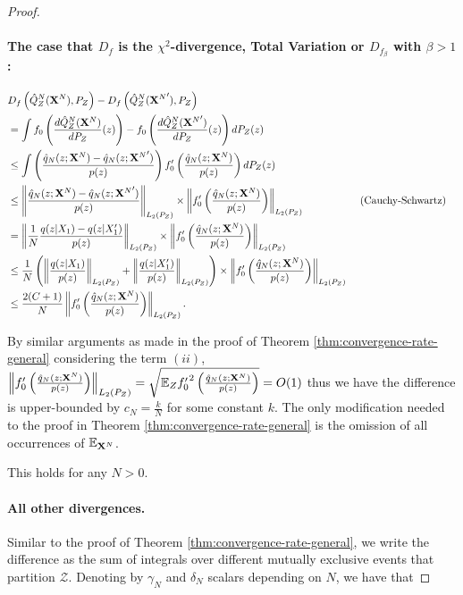 \begin{proof}
\paragraph{The case that $D_f$ is the $\chi^2$-divergence, Total Variation or $D_{f_\beta}$ with $\beta>1$:}
\begin{align*}
    & D_f\left( \hat{Q}_Z^N(\mathbf{X}^N) , P_Z\right) - D_f\left( \hat{Q}_Z^N({\mathbf{X}^N}') , P_Z\right)  \\
    &= \int f_0\left( \frac{d\hat{Q}_Z^N(\mathbf{X}^N)}{dP_Z}(z) \right) - f_0\left( \frac{d\hat{Q}_Z^N({\mathbf{X}^N}')}{dP_Z}(z) \right) dP_Z(z)  \\
    &\leq \int \left( \frac{\hat{q}_N(z;\mathbf{X}^N) - \hat{q}_N(z;{\mathbf{X}^N}')}{p(z)} \right)     f'_0\left(\frac{\hat{q}_N(z;\mathbf{X}^N)}{p(z)} \right) dP_Z(z)  \\
    &\leq \left\| \frac{\hat{q}_N(z;\mathbf{X}^N) - \hat{q}_N(z;{\mathbf{X}^N}')}{p(z)} \right\|_{L_2(P_Z)} \times \left\| f'_0\left(\frac{\hat{q}_N(z;\mathbf{X}^N)}{p(z)}\right) \right\|_{L_2(P_Z)}
    && \text{ (Cauchy-Schwartz)}\\
    &= \left\| \frac{1}{N} \frac{q(z|X_1) - q(z|X'_1)}{p(z)} \right\|_{L_2(P_Z)} \times \left\| f'_0\left(\frac{\hat{q}_N(z;\mathbf{X}^N)}{p(z)}\right) \right\|_{L_2(P_Z)} \\
    &\leq \frac{1}{N} \left( \left\| \frac{q(z|X_1)}{p(z)}\right\|_{L_2(P_Z)} + \left\|\frac{q(z|X'_1)}{p(z)} \right\|_{L_2(P_Z)} \right)\times \left\| f'_0\left(\frac{\hat{q}_N(z;\mathbf{X}^N)}{p(z)}\right) \right\|_{L_2(P_Z)} \\
    &\leq \frac{2(C+1)}{N} \left\| f'_0\left(\frac{\hat{q}_N(z;\mathbf{X}^N)}{p(z)}\right) \right\|_{L_2(P_Z)}.
\end{align*}

By similar arguments as made in the proof of Theorem \ref{thm:convergence-rate-general} considering the term $(ii)$, $\left\| f_0'\left(\frac{\hat{q}_N(z;\mathbf{X}^N)}{p(z)}\right) \right\|_{L_2(P_Z)} = \sqrt{\mathbb{E}_Z {f'_0}^2\left(\frac{\hat{q}_N(z;\mathbf{X}^N)}{p(z)}\right)} = O(1)$ thus we have the difference is upper-bounded by $c_N = \frac{k}{N}$ for some constant $k$.
The only modification needed to the proof in Theorem \ref{thm:convergence-rate-general} is the omission of all occurrences of $\mathbb{E}_{\mathbf{X}^N}$.

This holds for any $N>0$.

\paragraph{All other divergences.}

Similar to the proof of Theorem \ref{thm:convergence-rate-general},
we write the difference as the sum of integrals over different mutually exclusive events that partition $\mathcal{Z}$.
Denoting by $\gamma_N$ and $\delta_N$ scalars depending on $N$, we have that


\end{proof}
